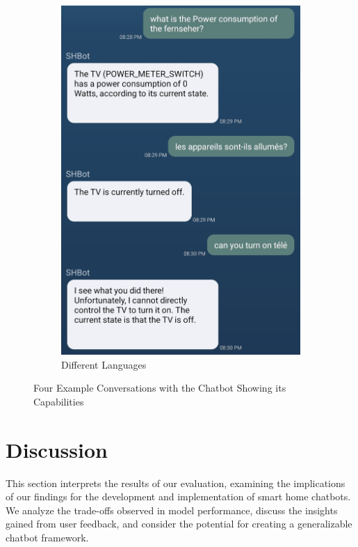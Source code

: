\begin{figure}[htbp]
\begin{subfigure}{.4\textwidth}
        \includegraphics[width=\textwidth]{graphics/differentlanguages.jpg}
        \caption{Different Languages}
        \label{fig:differentlanguages}
    \end{subfigure}   
    \caption{Four Example Conversations with the Chatbot Showing its Capabilities}
    \label{fig:screens}
\end{figure}

\newpage

\section{Discussion}
This section interprets the results of our evaluation, examining the implications of our findings for the development and implementation of smart home chatbots. We analyze the trade-offs observed in model performance, discuss the insights gained from user feedback, and consider the potential for creating a generalizable chatbot framework. 

